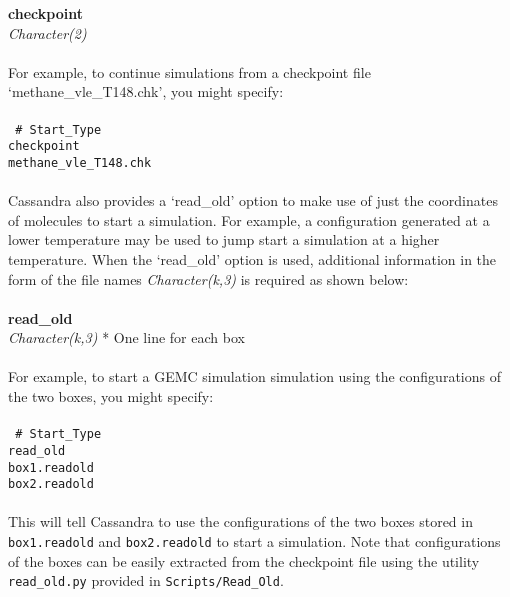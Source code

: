 %
{\bf checkpoint} \\
{\it Character(2)} \\ \\
%
For example, to continue simulations from a checkpoint file `methane\_vle\_T148.chk', you might specify: \\ \\
%
\texttt{
\# Start\_Type \\
checkpoint \\
methane\_vle\_T148.chk \\ \\ }
%
%
%
Cassandra also provides a `read\_old' option to make use of just the coordinates of molecules to start a simulation. For example, a configuration generated at a lower temperature may
be used to jump start a simulation at a higher temperature. When the `read\_old' option is used, additional information in the form of the file names {\it Character(k,3)} is required as
shown below: \\ \\
%
{\bf read\_old}\\
{\it Character(k,3)} * One line for each box \\ \\
%
For example, to start a GEMC simulation simulation using the configurations of the two boxes, you might specify: \\ \\
%
\texttt{
\# Start\_Type \\
read\_old \\
box1.readold \\ 
box2.readold \\ \\}
%
This will tell Cassandra to use the configurations of the two boxes stored in \texttt{box1.readold} and \texttt{box2.readold} to start a simulation. Note that configurations of the boxes 
can be easily extracted from the checkpoint file using the utility \texttt{read\_old.py} provided in \texttt{Scripts/Read\_Old}.
%
%
%
